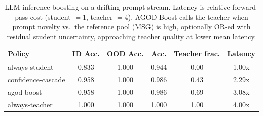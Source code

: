 \begin{table}[t]
\centering
\small
\caption{LLM inference boosting on a drifting prompt stream. Latency is relative forward-pass cost (student $=1$, teacher $=4$). AGOD-Boost calls the teacher when prompt novelty vs.\ the reference pool (MSG) is high, optionally OR-ed with residual student uncertainty, approaching teacher quality at lower mean latency.}
\label{tab:llm-boost}
\begin{tabular}{lccccc}
\toprule
Policy & ID Acc. & OOD Acc. & Acc. & Teacher frac. & Latency \\
\midrule
always-student & 0.833 & 1.000 & 0.944 & 0.00 & 1.00x \\
confidence-cascade & 0.958 & 1.000 & 0.986 & 0.43 & 2.29x \\
agod-boost & 0.958 & 1.000 & 0.986 & 0.69 & 3.08x \\
always-teacher & 1.000 & 1.000 & 1.000 & 1.00 & 4.00x \\
\bottomrule
\end{tabular}
\end{table}
